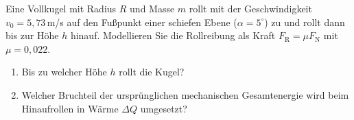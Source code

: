 \begin{ExerciseBlock}
Eine Vollkugel mit Radius $R$ und Masse $m$ rollt mit der Geschwindigkeit $v_0 = 5,73\,$m/s auf den Fußpunkt einer schiefen Ebene ($\alpha = 5^\circ$) zu und rollt dann bis zur Höhe $h$ hinauf. Modellieren Sie die Rollreibung als Kraft $F_\mathrm{R}=\mu F_\mathrm{N}$ mit $\mu=0{,}022$.

\begin{enumerate}
	\item Bis zu welcher Höhe $h$ rollt die Kugel?

	\item Welcher Bruchteil der ursprünglichen mechanischen Gesamtenergie wird beim Hinaufrollen in Wärme $\Delta Q$ umgesetzt?

\end{enumerate}

\begin{center}
\end{center}
\end{ExerciseBlock}
